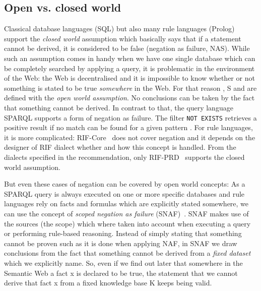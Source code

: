 \subsection{Open vs. closed world}\label{closedworld}
 Classical database languages (\eg SQL)  but also many rule languages (\eg Prolog) support the \emph{closed world} assumption which basically says that if a statement cannot 
be derived, 
it is considered to be false (negation as failure, NAS). While such an assumption comes in handy when we have one single database which can be completely searched by applying a query, 
it is problematic 
in the environment of the Web: the Web is decentralised and it is impossible to know whether or not something is stated to be true \emph{somewhere} in the Web.
For that reason \rdf, \rdf{}S and \owl are defined with the \emph{open world assumption}. No conclusions can be taken by the fact that something cannot be derived. 
In contrast to that, the query language SPARQL supports a form of negation as failure. The
filter \texttt{NOT EXISTS} retrieves a positive result if no match can be found for a given pattern \cite[Section 8]{sparql}.
For rule languages, it is more complicated:
RIF-Core~\cite{rifcore} does not cover negation and it depends on the designer of RIF dialect whether and how this concept is handled. From the dialects 
specified in the \wwwc recommendation, only RIF-PRD~\cite{rifprd} supports the closed world assumption. 

But even these cases of negation can be covered by open world concepts: As a SPARQL query is always executed on one or more specific databases and 
rule languages rely on facts and formulas which are explicitly stated somewhere, we  
can use the concept of \emph{scoped negation as failure} (SNAF)~\cite{kifer2005,snaf1,snaf2}. SNAF makes use of the sources (the scope) 
which where taken into account when executing a 
query or performing rule-based reasoning. Instead of simply stating that something cannot be proven such as it is done when applying NAF, in SNAF  we
draw conclusions from the fact that something cannot be derived from a \emph{fixed dataset} which we explicitly name. 
So, even if we find out later that somewhere in the Semantic Web a fact x is declared to be true, 
the statement that we cannot derive that fact x from a fixed knowledge base K 
keeps being valid.  


